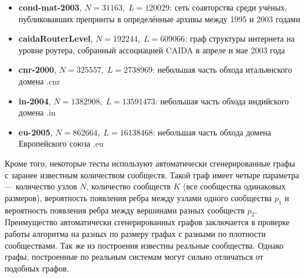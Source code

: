 \begin{itemize}
	\item \textbf{cond-mat-2003}, $N = 31163,\;L = 120029$: сеть соавторства среди учёных, публиковавших препринты в определённые архивы между 1995 и 2003 годами \cite{Newman:2001}
	\item \textbf{caidaRouterLevel}, $N = 192244,\;L =  609066$: граф структуры интернета на уровне роутера, собранный ассоциацией CAIDA в апреле и мае 2003 года
	\item \textbf{cnr-2000}, $N = 325557,\;L = 2738969$: небольшая часть обхода итальянского домена .cnr \cite{Boldi&Vigna:2004, Boldi&al:2011, Boldi&al:2004}
	\item \textbf{in-2004}, $N = 1382908,\;L = 13591473$: небольшая часть обхода индийского домена .in \cite{Boldi&Vigna:2004, Boldi&al:2011, Boldi&al:2004}
	\item \textbf{eu-2005}, $N = 862664,\;L = 16138468$: небольшая часть обхода домена Европейского союза .eu \cite{Boldi&Vigna:2004, Boldi&al:2011, Boldi&al:2004}

\end{itemize}

Кроме того, некоторые тесты используют автоматически сгенерированные графы с заранее известным количеством сообществ. Такой граф имеет четыре параметра --- количество узлов $N$, количество сообществ $K$ (все сообщества одинаковых размеров), вероятность появления ребра между узлами одного сообщества $p_1$ и вероятность появления ребра между вершинами разных сообществ $p_2$. Преимущество автоматически сгенерированных графов заключается в проверке работы алгоритма на разных по размеру графах с разными по плотности сообществами. Так же из построения известны реальные сообщества. Однако графы, построенные по реальным системам могут сильно отличаться от подобных графов.